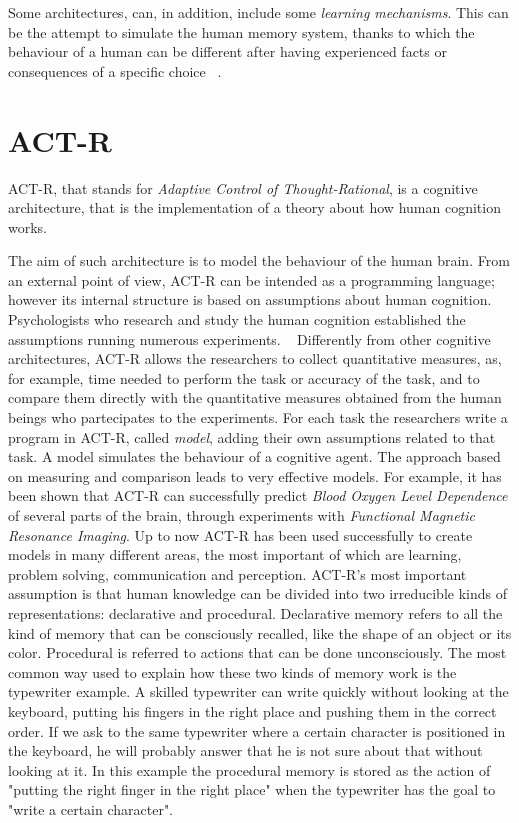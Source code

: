 	Some architectures, can, in addition, include some \emph{learning mechanisms}. This can be the attempt to simulate the human memory system, thanks to which the behaviour of a human can be different after having experienced facts or consequences of a specific choice ~\cite{Sears2012}.
	
	
  \section{ACT-R}
	\mbox{ACT-R}, that stands for \emph{Adaptive Control of Thought-Rational}, is a cognitive architecture, that is the implementation of a theory about how human cognition works.
	
	The aim of such architecture is to model the behaviour of the human brain. From an external point of view, \mbox{ACT-R} can be intended as a programming language; however its internal structure is based on assumptions about human cognition. Psychologists who research and study the human cognition established the assumptions running numerous experiments.  ~\cite{Allen94}
	Differently from other cognitive architectures, \mbox{ACT-R} allows the researchers to collect quantitative measures, as, for example, time needed to perform the task or accuracy of the task, and to compare them directly with the quantitative measures obtained from the human beings who partecipates to the experiments. For each task the researchers write a program in \mbox{ACT-R}, called \emph{model}, adding their own assumptions related to that task. 
	A model simulates the behaviour of a cognitive agent. The approach based on measuring and comparison leads to very effective models. For example, it has been shown that \mbox{ACT-R} can successfully predict \emph{Blood Oxygen Level Dependence} of several parts of the brain, through experiments with \emph{Functional Magnetic Resonance Imaging}.
	Up to now \mbox{ACT-R} has been used successfully to create models in many different areas, the most important of which are learning, problem solving, communication and perception.
\newline
	\mbox{ACT-R's} most important assumption is that human knowledge can be divided into two irreducible kinds of representations: declarative and procedural.
	Declarative memory refers to all the kind of memory that can be consciously recalled, like the shape of an object or its color. Procedural is referred to actions that can be done unconsciously. The most common way used to explain how these two kinds of memory work is the typewriter example. 
	A skilled typewriter can write quickly without looking at the keyboard, putting his fingers in the right place and pushing them in the correct order. If we ask to the same typewriter where a certain character is positioned in the keyboard, he will probably answer that he is not sure about that without looking at it. In this example the procedural memory is stored as the action of "putting the right finger in the right place" when the typewriter has the goal to "write a certain character". 

